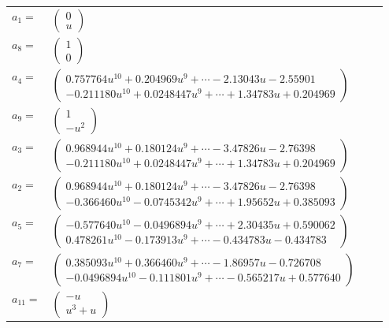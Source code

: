 \documentclass[1p]{elsarticle_modified}
\theoremstyle{definition}
\begin{document}
\begin{tabular}{m{7pt} m{180pt} m{7pt} m{180pt} }
\flushright $a_{1}=$&$\begin{pmatrix}0\\u\end{pmatrix}$ \\
\flushright $a_{8}=$&$\begin{pmatrix}1\\0\end{pmatrix}$ \\
\flushright $a_{4}=$&$\begin{pmatrix}0.757764 u^{10}+0.204969 u^{9}+\cdots-2.13043 u-2.55901\\-0.211180 u^{10}+0.0248447 u^{9}+\cdots+1.34783 u+0.204969\end{pmatrix}$ \\
\flushright $a_{9}=$&$\begin{pmatrix}1\\- u^2\end{pmatrix}$ \\
\flushright $a_{3}=$&$\begin{pmatrix}0.968944 u^{10}+0.180124 u^{9}+\cdots-3.47826 u-2.76398\\-0.211180 u^{10}+0.0248447 u^{9}+\cdots+1.34783 u+0.204969\end{pmatrix}$ \\
\flushright $a_{2}=$&$\begin{pmatrix}0.968944 u^{10}+0.180124 u^{9}+\cdots-3.47826 u-2.76398\\-0.366460 u^{10}-0.0745342 u^{9}+\cdots+1.95652 u+0.385093\end{pmatrix}$ \\
\flushright $a_{5}=$&$\begin{pmatrix}-0.577640 u^{10}-0.0496894 u^{9}+\cdots+2.30435 u+0.590062\\0.478261 u^{10}-0.173913 u^{9}+\cdots-0.434783 u-0.434783\end{pmatrix}$ \\
\flushright $a_{7}=$&$\begin{pmatrix}0.385093 u^{10}+0.366460 u^{9}+\cdots-1.86957 u-0.726708\\-0.0496894 u^{10}-0.111801 u^{9}+\cdots-0.565217 u+0.577640\end{pmatrix}$ \\
\flushright $a_{11}=$&$\begin{pmatrix}- u\\u^3+u\end{pmatrix}$ \\

\end{tabular}
\end{document}

